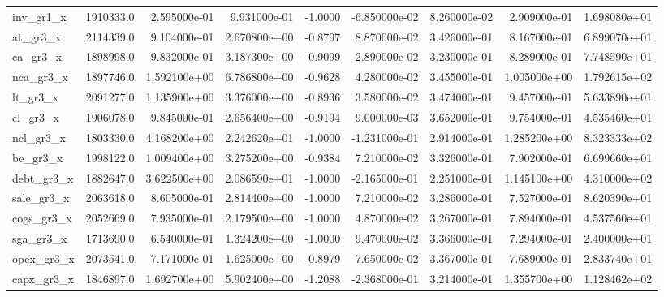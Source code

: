 \documentclass[12pt]{article}
\begin{document}
\begin{landscape}
\begin{longtable}{|l|r|r|r|r|r|r|r|r|}
inv\_gr1\_x               &  1910333.0 &  2.595000e-01 &  9.931000e-01 &     -1.0000 & -6.850000e-02 &  8.260000e-02 &  2.909000e-01 &  1.698080e+01 \\
at\_gr3\_x                &  2114339.0 &  9.104000e-01 &  2.670800e+00 &     -0.8797 &  8.870000e-02 &  3.426000e-01 &  8.167000e-01 &  6.899070e+01 \\
ca\_gr3\_x                &  1898998.0 &  9.832000e-01 &  3.187300e+00 &     -0.9099 &  2.890000e-02 &  3.230000e-01 &  8.289000e-01 &  7.748590e+01 \\
nca\_gr3\_x               &  1897746.0 &  1.592100e+00 &  6.786800e+00 &     -0.9628 &  4.280000e-02 &  3.455000e-01 &  1.005000e+00 &  1.792615e+02 \\
lt\_gr3\_x                &  2091277.0 &  1.135900e+00 &  3.376000e+00 &     -0.8936 &  3.580000e-02 &  3.474000e-01 &  9.457000e-01 &  5.633890e+01 \\
cl\_gr3\_x                &  1906078.0 &  9.845000e-01 &  2.656400e+00 &     -0.9194 &  9.000000e-03 &  3.652000e-01 &  9.754000e-01 &  4.535460e+01 \\
ncl\_gr3\_x               &  1803330.0 &  4.168200e+00 &  2.242620e+01 &     -1.0000 & -1.231000e-01 &  2.914000e-01 &  1.285200e+00 &  8.323333e+02 \\
be\_gr3\_x                &  1998122.0 &  1.009400e+00 &  3.275200e+00 &     -0.9384 &  7.210000e-02 &  3.326000e-01 &  7.902000e-01 &  6.699660e+01 \\
debt\_gr3\_x              &  1882647.0 &  3.622500e+00 &  2.086590e+01 &     -1.0000 & -2.165000e-01 &  2.251000e-01 &  1.145100e+00 &  4.310000e+02 \\
sale\_gr3\_x              &  2063618.0 &  8.605000e-01 &  2.814400e+00 &     -1.0000 &  7.210000e-02 &  3.286000e-01 &  7.527000e-01 &  8.620390e+01 \\
cogs\_gr3\_x              &  2052669.0 &  7.935000e-01 &  2.179500e+00 &     -1.0000 &  4.870000e-02 &  3.267000e-01 &  7.894000e-01 &  4.537560e+01 \\
sga\_gr3\_x               &  1713690.0 &  6.540000e-01 &  1.324200e+00 &     -1.0000 &  9.470000e-02 &  3.366000e-01 &  7.294000e-01 &  2.400000e+01 \\
opex\_gr3\_x              &  2073541.0 &  7.171000e-01 &  1.625000e+00 &     -0.8979 &  7.650000e-02 &  3.367000e-01 &  7.689000e-01 &  2.833740e+01 \\
capx\_gr3\_x              &  1846897.0 &  1.692700e+00 &  5.902400e+00 &     -1.2088 & -2.368000e-01 &  3.214000e-01 &  1.355700e+00 &  1.128462e+02 \\

\end{longtable}
\end{landscape}
\end{document}

